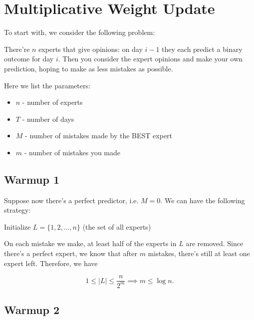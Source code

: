 \chapter{Multiplicative Weight Update}

To start with, we consider the following problem:

\begin{question}

  There're $n$ experts that give opinions: on day $i-1$ they each predict a binary outcome for day $i$. Then you consider the expert opinions and make your own prediction, hoping to make as less mistakes as possible.

  \end{question}

Here we list the parameters:

  \begin{itemize}
    \item $n$ - number of experts
    \item $T$ - number of days
    \item $M$ - number of mistakes made by the BEST expert
    \item $m$ - number of mistakes you made
  \end{itemize}


\section{Warmup 1}

Suppose now there's a perfect predictor, i.e. $M=0$. We can have the following strategy:

\begin{algorithm}
    \caption{Perfect Expert Algorithm}
    \label{alg:perfect-expert}
    Initialize $L = \{1, 2, \ldots, n\}$ (the set of all experts)\;
\end{algorithm}

On each mistake we make, at least half of the experts in $L$ are removed. Since there's a perfect expert, we know that after $m$ mistakes, there's still at least one expert left. Therefore, we have

\[ 1\leq |L| \leq \frac{n}{2^m} \implies m \leq \log n. \]

\section{Warmup 2}

